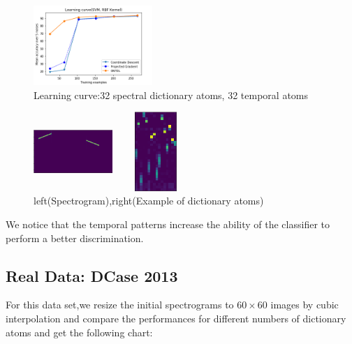 \documentclass{article}
\begin{document}
\begin{figure}[!ht]
\centering
\includegraphics[width=4.5cm]{LearningCurveToy.png}
\caption{Learning curve:32 spectral dictionary atoms, 32 temporal atoms}
\end{figure}

\begin{figure}[!ht]
\centering
\begin{minipage}[t]{4cm}
\centering
\includegraphics[width=3.0cm,height=3cm]{SpectrogramToy.png}
\end{minipage}
\begin{minipage}[t]{3cm}
\centering
\includegraphics[width =3.0cm,height=3cm]{SpectralDictionaryPaper1.png}
\end{minipage}
\caption{left(Spectrogram),right(Example of dictionary atoms)}
\end{figure}
We notice that the temporal patterns increase the ability of the classifier to perform a better discrimination.
\subsection{Real Data: DCase 2013}
For this data set,we resize the initial spectrograms to $60\times60$ images by cubic interpolation and compare the performances for different numbers of dictionary atoms and get the following chart:

% 
% 
%
\end{document}
